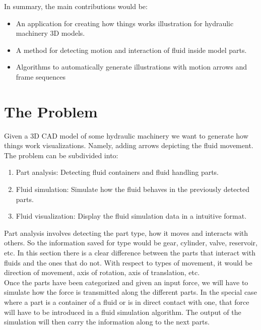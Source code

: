 \documentclass[11pt]{report}
\begin{document}
In summary, the main contributions would be:
\begin{itemize}
\item An application for creating how things works illustration for hydraulic machinery 3D models.
\item A method for detecting motion and interaction of fluid inside model parts.
\item Algorithms to automatically generate illustrations with motion arrows and frame sequences
\end{itemize}


\section{The Problem}
\label{sec:problem}

Given a 3D CAD model of some hydraulic machinery we want to generate how things work visualizations.
Namely, adding arrows depicting the fluid movement.\\

The problem can be subdivided into:
\begin{enumerate}
\item Part analysis: Detecting fluid containers and fluid handling parts.
\item Fluid simulation: Simulate how the fluid behaves in the previously detected parts.
\item Fluid visualization: Display the fluid simulation data in a intuitive format.\\
\end{enumerate}

Part analysis involves detecting the part type, how it moves and interacts with others.
So the information saved for type would be gear, cylinder, valve, reservoir, etc.
In this section there is a clear difference between the parts that interact with fluids and the ones that do not. 
With respect to types of movement, it would be direction of movement, axis of rotation, axis of translation, etc.\\

Once the parts have been categorized and given an input force, we will have to simulate how the force is transmitted along the different parts.
In the special case where a part is a container of a fluid or is in direct contact with one, that force will have to be introduced in a fluid simulation algorithm.
The output of the simulation will then carry the information along to the next parts.\\
\end{document}
